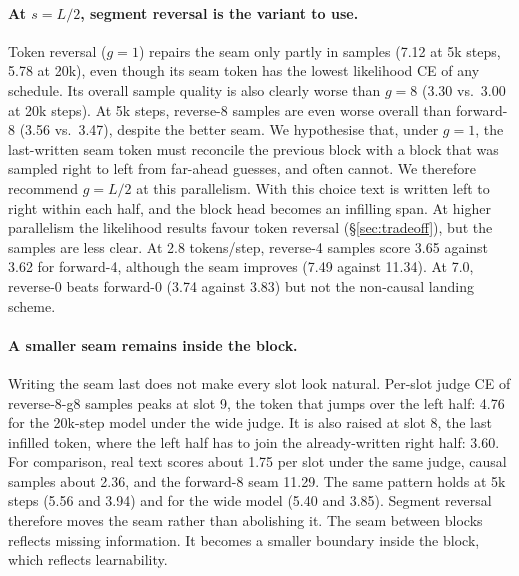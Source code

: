 \documentclass[11pt]{article}
\theoremstyle{definition}
\theoremstyle{remark}
\newcommand{\sch}[1]{\textsf{#1}}
\begin{document}
\paragraph{At $s=L/2$, segment reversal is the variant to use.}
Token reversal ($g=1$) repairs the seam only partly in samples (7.12 at 5k steps, 5.78 at 20k), even though its seam token has the lowest likelihood CE of any schedule.
Its overall sample quality is also clearly worse than $g=8$ (3.30 vs.\ 3.00 at 20k steps).
At 5k steps, \sch{reverse-8} samples are even worse overall than \sch{forward-8} (3.56 vs.\ 3.47), despite the better seam.
We hypothesise that, under $g=1$, the last-written seam token must reconcile the previous block with a block that was sampled right to left from far-ahead guesses, and often cannot.
We therefore recommend $g=L/2$ at this parallelism.
With this choice text is written left to right within each half, and the block head becomes an infilling span.
At higher parallelism the likelihood results favour token reversal (\S\ref{sec:tradeoff}), but the samples are less clear.
At 2.8 tokens/step, \sch{reverse-4} samples score 3.65 against 3.62 for \sch{forward-4}, although the seam improves (7.49 against 11.34).
At 7.0, \sch{reverse-0} beats \sch{forward-0} (3.74 against 3.83) but not the non-causal \sch{landing} scheme.

\paragraph{A smaller seam remains inside the block.}
Writing the seam last does not make every slot look natural.
Per-slot judge CE of \sch{reverse-8-g8} samples peaks at slot 9, the token that jumps over the left half: 4.76 for the 20k-step model under the wide judge.
It is also raised at slot 8, the last infilled token, where the left half has to join the already-written right half: 3.60.
For comparison, real text scores about 1.75 per slot under the same judge, causal samples about 2.36, and the \sch{forward-8} seam 11.29.
The same pattern holds at 5k steps (5.56 and 3.94) and for the wide model (5.40 and 3.85).
Segment reversal therefore moves the seam rather than abolishing it.
The seam between blocks reflects missing information.
It becomes a smaller boundary inside the block, which reflects learnability.
\end{document}
